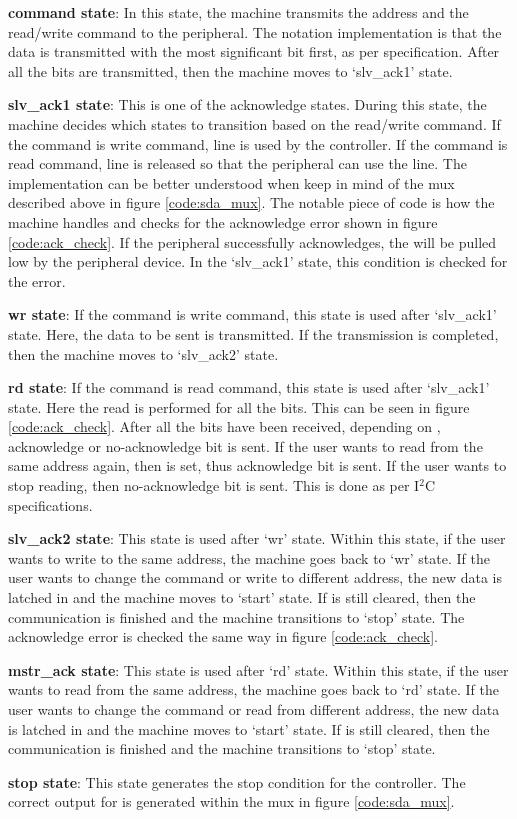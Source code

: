 
\textbf{command state}: In this state, the machine transmits the address and the read/write command to the peripheral. The notation implementation is that the data is transmitted with the most significant bit first, as per specification. After all the bits are transmitted, then the machine moves to `slv\_ack1' state.

\textbf{slv\_ack1 state}: This is one of the acknowledge states. During this state, the machine decides which states to transition based on the read/write command. If the command is write command,  line is used by the controller. If the command is read command,  line is released so that the peripheral can use the line. The implementation can be better understood when keep in mind of the  mux described above in figure \ref{code:sda_mux}. The notable piece of code is how the machine handles and checks for the acknowledge error shown in figure \ref{code:ack_check}. If the peripheral successfully acknowledges, the  will be pulled low by the peripheral device. In the `slv\_ack1' state, this condition is checked for the error.


\textbf{wr state}: If the command is write command, this state is used after `slv\_ack1' state. Here, the data to be sent is transmitted. If the transmission is completed, then the machine moves to `slv\_ack2' state.

\textbf{rd state}: If the command is read command, this state is used after `slv\_ack1' state. Here the read is performed for all the bits. This can be seen in figure \ref{code:ack_check}. After all the bits have been received, depending on , acknowledge or no-acknowledge bit is sent. If the user wants to read from the same address again, then  is set, thus acknowledge bit is sent. If the user wants to stop reading, then no-acknowledge bit is sent. This is done as per I$^2$C specifications.

\textbf{slv\_ack2 state}: This state is used after `wr' state. Within this state, if the user wants to write to the same address, the machine goes back to `wr' state. If the user wants to change the command or write to different address, the new data is latched in and the machine moves to `start' state. If  is still cleared, then the communication is finished and the machine transitions to `stop' state. The acknowledge error is checked the same way in figure \ref{code:ack_check}.

\textbf{mstr\_ack state}: This state is used after `rd' state. Within this state, if the user wants to read from the same address, the machine goes back to `rd' state. If the user wants to change the command or read from different address, the new data is latched in and the machine moves to `start' state. If  is still cleared, then the communication is finished and the machine transitions to `stop' state.

\textbf{stop state}: This state generates the stop condition for the controller. The correct output for  is generated within the mux in figure \ref{code:sda_mux}.
